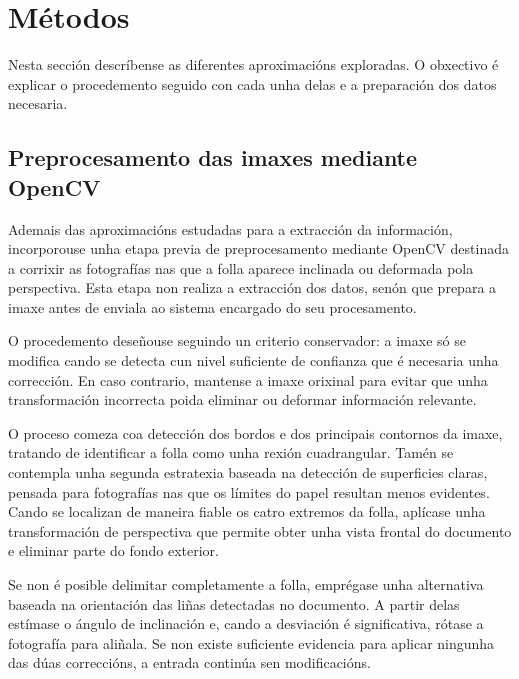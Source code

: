 


\section{Métodos}
\label{sec:metodos-procesamento}

Nesta sección descríbense as diferentes aproximacións exploradas. O obxectivo é explicar o procedemento seguido con cada unha delas e a preparación dos datos necesaria.

\subsection{Preprocesamento das imaxes mediante OpenCV}
\label{sec:preprocesamento-opencv}

Ademais das aproximacións estudadas para a extracción da información, incorporouse unha etapa previa de preprocesamento mediante OpenCV destinada a corrixir as fotografías nas que a folla aparece inclinada ou deformada pola perspectiva. Esta etapa non realiza a extracción dos datos, senón que prepara a imaxe antes de enviala ao sistema encargado do seu procesamento.

O procedemento deseñouse seguindo un criterio conservador: a imaxe só se modifica cando se detecta cun nivel suficiente de confianza que é necesaria unha corrección. En caso contrario, mantense a imaxe orixinal para evitar que unha transformación incorrecta poida eliminar ou deformar información relevante.

O proceso comeza coa detección dos bordos e dos principais contornos da imaxe, tratando de identificar a folla como unha rexión cuadrangular. Tamén se contempla unha segunda estratexia baseada na detección de superficies claras, pensada para fotografías nas que os límites do papel resultan menos evidentes. Cando se localizan de maneira fiable os catro extremos da folla, aplícase unha transformación de perspectiva que permite obter unha vista frontal do documento e eliminar parte do fondo exterior.

Se non é posible delimitar completamente a folla, emprégase unha alternativa baseada na orientación das liñas detectadas no documento. A partir delas estímase o ángulo de inclinación e, cando a desviación é significativa, rótase a fotografía para aliñala. Se non existe suficiente evidencia para aplicar ningunha das dúas correccións, a entrada continúa sen modificacións.

